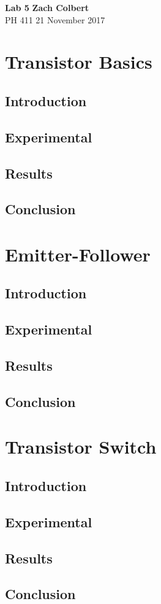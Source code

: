 \documentclass[11pt]{article}
\begin{document}
\noindent
\large\textbf{Lab 5} \hfill \textbf{Zach Colbert} \\
\normalsize PH 411 \hfill 21 November 2017\\

\section{Transistor Basics}
\subsection{Introduction}

\subsection{Experimental}

\subsection{Results}

\subsection{Conclusion}
    

\section{Emitter-Follower}
\subsection{Introduction}

\subsection{Experimental}

\subsection{Results}

\subsection{Conclusion}


\section{Transistor Switch}
\subsection{Introduction}

\subsection{Experimental}

\subsection{Results}

\subsection{Conclusion}
\end{document}
